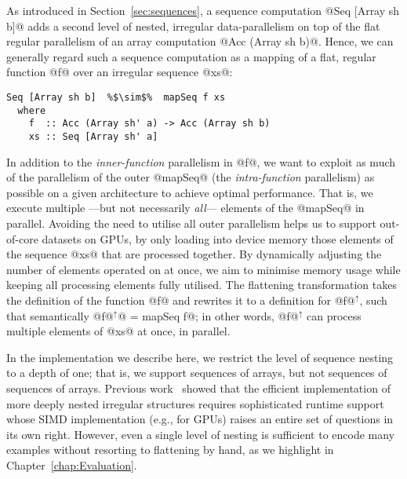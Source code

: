 As introduced in Section~\ref{sec:sequences}, a sequence computation @Seq [Array sh b]@ adds a second level of nested, irregular data-parallelism on top of the flat regular parallelism of an array computation @Acc (Array sh b)@. Hence, we can generally regard such a sequence computation as a mapping of a flat, regular function @f@ over an irregular sequence @xs@:
%
\begin{lstlisting}
Seq [Array sh b]  %$\sim$%  mapSeq f xs
  where
    f  :: Acc (Array sh' a) -> Acc (Array sh b)
    xs :: Seq [Array sh' a]
\end{lstlisting}
%
In addition to the \emph{inner-function} parallelism in @f@, we want to
exploit as much of the parallelism of the outer @mapSeq@ (the \emph{intra-function} parallelism) as possible on a
given architecture to achieve optimal performance. That is, we execute multiple ---but not necessarily \emph{all}--- elements of the @mapSeq@ in
parallel. Avoiding the need to utilise all outer parallelism helps us to support out-of-core datasets on GPUs, by only loading into
device memory those elements of the sequence @xs@ that are processed together. By
dynamically adjusting the number of elements operated on at once, we aim to
minimise memory usage while keeping all processing elements fully utilised. The flattening transformation takes the definition of the function @f@ and rewrites it to a definition for @f@$^\uparrow$, such that semantically @f@$^\uparrow$@ = mapSeq f@; in other words, @f@$^\uparrow$ can process multiple elements of @xs@ at once, in parallel.

In the implementation we describe here, we restrict the level of sequence nesting to a depth of one; that is, we support sequences of arrays, but not sequences of sequences of arrays. Previous work~\citep{Lippmeier:replicate} showed that the efficient implementation of more deeply nested irregular structures requires sophisticated runtime support whose SIMD implementation (e.g., for GPUs) raises an entire set of questions in its own right. However, even a single level of nesting is sufficient to encode many examples without resorting to flattening by hand, as we highlight in Chapter~\ref{chap:Evaluation}.


